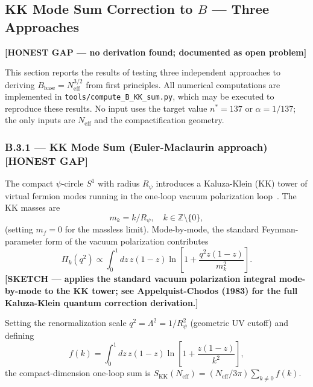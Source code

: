 \documentclass[11pt,a4paper]{article}
\theoremstyle{remark}
\begin{document}
\subsection{KK Mode Sum Correction to $B$ — Three Approaches}
\label{sec:B-KK-correction}

\textbf{[HONEST GAP — no derivation found; documented as open problem]}

This section reports the results of testing three independent approaches to
deriving $B_{\mathrm{base}} = N_{\mathrm{eff}}^{3/2}$ from first principles.
All numerical computations are implemented in \texttt{tools/compute\_B\_KK\_sum.py},
which may be executed to reproduce these results.  No input uses the target
value $n^* = 137$ or $\alpha = 1/137$; the only inputs are $N_{\mathrm{eff}}$
and the compactification geometry.

\subsubsection*{B.3.1 — KK Mode Sum (Euler-Maclaurin approach)  \textbf{[HONEST GAP]}}
\label{sec:B3-KK-euler}

The compact $\psi$-circle $S^1$ with radius $R_\psi$ introduces a Kaluza-Klein
(KK) tower of virtual fermion modes running in the one-loop vacuum polarization
loop~\cite{Appelquist1983}.  The KK masses are
\begin{equation}
m_k = k/R_\psi, \quad k \in \mathbb{Z} \setminus \{0\},
\label{eq:KK-masses}
\end{equation}
(setting $m_f = 0$ for the massless limit).  Mode-by-mode, the standard
Feynman-parameter form of the vacuum polarization contributes
\begin{equation}
\Pi_k(q^2) \propto \int_0^1 dz\, z(1-z)\ln\!\left[1 + \frac{q^2 z(1-z)}{m_k^2}\right].
\label{eq:Pi-k}
\end{equation}
\textbf{[SKETCH — applies the standard vacuum polarization integral
mode-by-mode to the KK tower; see Appelquist-Chodos (1983) for the full
Kaluza-Klein quantum correction derivation.]}

Setting the renormalization scale $q^2 = \Lambda^2 = 1/R_\psi^2$ (geometric UV
cutoff) and defining
\begin{equation}
f(k) = \int_0^1 dz\, z(1-z)\ln\!\left[1 + \frac{z(1-z)}{k^2}\right],
\label{eq:f-k}
\end{equation}
the compact-dimension one-loop sum is
$S_{\mathrm{KK}}(N_{\mathrm{eff}}) = (N_{\mathrm{eff}}/3\pi)\sum_{k \neq 0} f(k)$.
\end{document}
